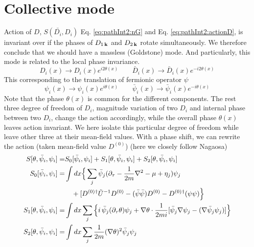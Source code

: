 \section{Collective mode}
%

 Action of $D$, $S(\bar{D_i},D_i)$ Eq. \eqref{eq:pathInt2:nG} and Eq. \eqref{eq:pathInt2:actionD}, is invariant over if the phases of $D_{1\,\mathbf{k}}$ and $D_{2\,\mathbf{k}}$ rotate simultaneously. We therefore conclude that we should have a massless (Goldstone) mode.  And particularly, this mode is related to the local phase invariance. 
\begin{equation*}
D_{i}(x)\rightarrow{}D_{i}(x)e^{i2\theta(x)}\qquad{}
\bar{D}_{i}(x)\rightarrow{}\bar{D}_{i}(x)e^{-i2\theta(x)}
\end{equation*}
This corresponding to the translation of fermionic operator $\psi$
\begin{equation*}
\psi_{i}(x)\rightarrow{}\psi_{i}(x)e^{i\theta(x)}\qquad{}
\bar{\psi}_{i}(x)\rightarrow{}\bar{\psi}_{i}(x)e^{-i\theta(x)}
\end{equation*}
Note that the phase $\theta(x)$ is common for the different components. The rest three degree of freedom of $D_i$, magnitude variation of two $D_i$ and internal phase between two $D_i$, change the action accordingly, while the overall phase $\theta(x)$ leaves action invariant.  We here isolate this particular degree of freedom while leave other three at their mean-field values. With a phase shift, we can rewrite the action (taken mean-field value $D^{(0)}$) (here we closely follow Nagaosa\cite{Nagaosa})
\begin{subequations}
\begin{align}\label{eq:pathInt2:actionPhase}
S[\theta,\bar\psi_{i},\psi_{i}]=&S_0[\bar\psi_{i},\psi_{i}]+S_1[\theta,\bar\psi_{i},\psi_{i}]+S_2[\theta,\bar\psi_{i},\psi_{i}]\\
S_0[\bar\psi_{i},\psi_{i}]=&\int{dx}
\Big\{\sum_{j}\bar\psi_{j}(\partial_\tau-\frac{1}{2m}\nabla^{2}-\mu+\eta_{j})\psi_{j}\nonumber\\
&\quad+[D^{(0)}{}^{\dagger}\tilde{U}^{-1}D^{(0)}-(\bar\psi\bar\psi)D^{(0)}-{D^{(0)}}{}^{\dagger}(\psi\psi)\Big\}\\
S_1[\theta,\bar\psi_{i},\psi_{i}]=&\int{dx}\sum_{j}\Big\{
   i\,\bar\psi_{j}(\partial_{\tau}\theta)\psi_{j}+\nabla\theta\cdot\frac{1}{2mi}[\bar\psi_{j}\nabla\psi_{j}-(\nabla\bar{\psi}_{j}\psi_{j})]\Big\}\\
S_2[\theta,\bar\psi_{i},\psi_{i}]=&\int{dx}\sum_{j}\frac{1}{2m}(\nabla\theta)^{2}\bar\psi_{j}\psi_{j}
\end{align}
\end{subequations}
